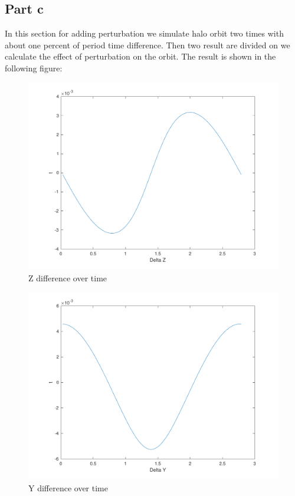 \subsection{Part c}
In this section for adding perturbation we simulate halo orbit two times with about one percent of period time difference. Then two result are divided on we calculate the effect of perturbation on the orbit. The result is shown in the following figure:
\begin{figure}[H]
    \centering
    \includegraphics[width=\textwidth]{../Figure/Q2/Q2_1}
    \caption{Z difference over time}
\end{figure}

\begin{figure}[H]
    \centering
    \includegraphics[width=\textwidth]{../Figure/Q2/Q2_2}
    \caption{Y difference over time}
\end{figure}

